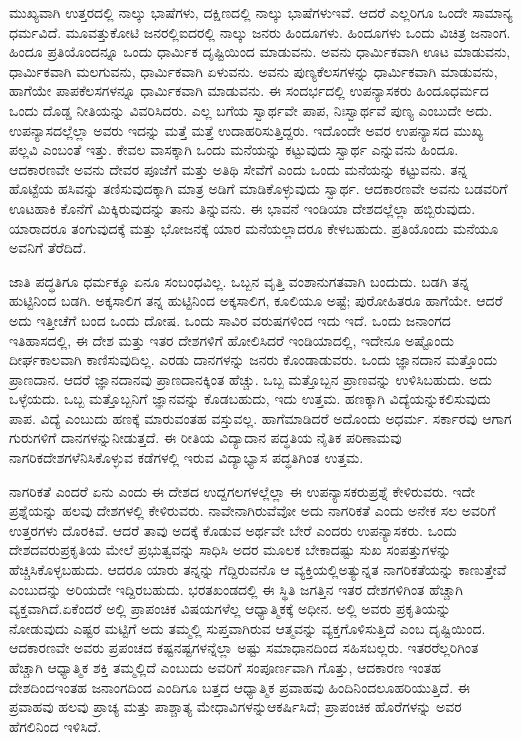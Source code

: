 ಮುಖ್ಯವಾಗಿ ಉತ್ತರದಲ್ಲಿ ನಾಲ್ಕು ಭಾಷೆಗಳು, ದಕ್ಷಿಣದಲ್ಲಿ ನಾಲ್ಕು ಭಾಷೆಗಳು\break ಇವೆ. ಆದರೆ ಎಲ್ಲರಿಗೂ ಒಂದೇ ಸಾಮಾನ್ಯ ಧರ್ಮವಿದೆ. ಮೂವತ್ತುಕೋಟಿ ಜನರಲ್ಲಿ\break ಐದರಲ್ಲಿ ನಾಲ್ಕು ಜನರು ಹಿಂದೂಗಳು. ಹಿಂದೂಗಳು ಒಂದು ವಿಚಿತ್ರ ಜನಾಂಗ. ಹಿಂದೂ ಪ್ರತಿಯೊಂದನ್ನೂ ಒಂದು ಧಾರ್ಮಿಕ ದೃಷ್ಟಿಯಿಂದ ಮಾಡುವನು. ಅವನು ಧಾರ್ಮಿಕವಾಗಿ ಊಟ ಮಾಡುವನು, ಧಾರ್ಮಿಕವಾಗಿ ಮಲಗುವನು, ಧಾರ್ಮಿಕವಾಗಿ ಏಳುವನು. ಅವನು ಪುಣ್ಯಕೆಲಸಗಳನ್ನು ಧಾರ್ಮಿಕವಾಗಿ ಮಾಡುವನು, ಹಾಗೆಯೇ ಪಾಪಕೆಲಸಗಳನ್ನೂ ಧಾರ್ಮಿಕವಾಗಿ ಮಾಡುವನು. ಈ ಸಂದರ್ಭದಲ್ಲಿ ಉಪನ್ಯಾಸಕರು ಹಿಂದೂಧರ್ಮದ ಒಂದು ದೊಡ್ಡ ನೀತಿಯನ್ನು ವಿವರಿಸಿದರು. ಎಲ್ಲ ಬಗೆಯ ಸ್ವಾರ್ಥವೇ ಪಾಪ, ನಿಃಸ್ವಾರ್ಥವೆ ಪುಣ್ಯ ಎಂಬುದೇ ಅದು. ಉಪನ್ಯಾಸದಲ್ಲೆಲ್ಲಾ ಅವರು ಇದನ್ನು ಮತ್ತೆ ಮತ್ತೆ ಉದಾಹರಿಸುತ್ತಿದ್ದರು. ಇದೊಂದೇ ಅವರ ಉಪನ್ಯಾಸದ ಮುಖ್ಯ ಪಲ್ಲವಿ ಎಂಬಂತೆ ಇತ್ತು. ಕೇವಲ ವಾಸಕ್ಕಾಗಿ ಒಂದು ಮನೆಯನ್ನು ಕಟ್ಟುವುದು ಸ್ವಾರ್ಥ ಎನ್ನುವನು ಹಿಂದೂ. ಆದಕಾರಣವೇ ಅವನು ದೇವರ ಪೂಜೆಗೆ ಮತ್ತು ಅತಿಥಿ ಸೇವೆಗೆ ಎಂದು ಒಂದು ಮನೆಯನ್ನು ಕಟ್ಟುವನು. ತನ್ನ ಹೊಟ್ಟೆಯ ಹಸಿವನ್ನು ತಣಿಸುವುದಕ್ಕಾಗಿ ಮಾತ್ರ ಅಡಿಗೆ ಮಾಡಿಕೊಳ್ಳುವುದು ಸ್ವಾರ್ಥ. ಆದಕಾರಣವೇ ಅವನು ಬಡವರಿಗೆ ಊಟಹಾಕಿ ಕೊನೆಗೆ ಮಿಕ್ಕಿರುವುದನ್ನು ತಾನು ತಿನ್ನುವನು. ಈ ಭಾವನೆ ಇಂಡಿಯಾ ದೇಶದಲ್ಲೆಲ್ಲಾ ಹಬ್ಬಿರುವುದು. ಯಾರಾದರೂ ತಂಗುವುದಕ್ಕೆ ಮತ್ತು ಭೋಜನಕ್ಕೆ ಯಾರ ಮನೆಯಲ್ಲಾದರೂ ಕೇಳಬಹುದು. ಪ್ರತಿಯೊಂದು ಮನೆಯೂ ಅವನಿಗೆ ತೆರೆದಿದೆ.

ಜಾತಿ ಪದ್ಧತಿಗೂ ಧರ್ಮಕ್ಕೂ ಏನೂ ಸಂಬಂಧವಿಲ್ಲ. ಒಬ್ಬನ ವೃತ್ತಿ ವಂಶಾನುಗತವಾಗಿ ಬಂದುದು. ಬಡಗಿ ತನ್ನ ಹುಟ್ಟಿನಿಂದ ಬಡಗಿ. ಅಕ್ಕಸಾಲಿಗ ತನ್ನ ಹುಟ್ಟಿನಿಂದ ಅಕ್ಕಸಾಲಿಗ, ಕೂಲಿಯೂ ಅಷ್ಟೆ; ಪುರೋಹಿತರೂ ಹಾಗೆಯೇ. ಆದರೆ ಅದು ಇತ್ತೀಚೆಗೆ ಬಂದ ಒಂದು ದೋಷ. ಒಂದು ಸಾವಿರ ವರುಷಗಳಿಂದ ಇದು ಇದೆ. ಒಂದು ಜನಾಂಗದ ಇತಿಹಾಸದಲ್ಲಿ, ಈ ದೇಶ ಮತ್ತು ಇತರ ದೇಶಗಳಿಗೆ ಹೋಲಿಸಿದರೆ ಇಂಡಿಯಾದಲ್ಲಿ, ಇದೇನೂ ಅಷ್ಟೊಂದು ದೀರ್ಘಕಾಲವಾಗಿ ಕಾಣಿಸುವುದಿಲ್ಲ. ಎರಡು ದಾನಗಳನ್ನು ಜನರು ಕೊಂಡಾಡುವರು. ಒಂದು ಜ್ಞಾನದಾನ ಮತ್ತೊಂದು ಪ್ರಾಣದಾನ. ಆದರೆ ಜ್ಞಾನದಾನವು ಪ್ರಾಣದಾನಕ್ಕಿಂತ ಹೆಚ್ಚು. ಒಬ್ಬ ಮತ್ತೊಬ್ಬನ ಪ್ರಾಣವನ್ನು ಉಳಿಸಿಬಹುದು. ಅದು ಒಳ್ಳೆಯದು. ಒಬ್ಬ ಮತ್ತೊಬ್ಬನಿಗೆ ಜ್ಞಾನವನ್ನು ಕೊಡಬಹುದು, ಇದು ಉತ್ತಮ. ಹಣಕ್ಕಾಗಿ ವಿದ್ಯೆಯನ್ನು\break ಕಲಿಸುವುದು ಪಾಪ. ವಿದ್ಯೆ ಎಂಬುದು ಹಣಕ್ಕೆ ಮಾರುವಂತಹ ವಸ್ತುವಲ್ಲ. ಹಾಗೆ\break ಮಾಡಿದರೆ ಅದೊಂದು ಅಧರ್ಮ. ಸರ್ಕಾರವು ಆಗಾಗ ಗುರುಗಳಿಗೆ ದಾನಗಳನ್ನು\break ನೀಡುತ್ತದೆ. ಈ ರೀತಿಯ ವಿದ್ಯಾದಾನ ಪದ್ಧತಿಯ ನೈತಿಕ ಪರಿಣಾಮವು ನಾಗರಿಕ\break ದೇಶಗಳೆನಿಸಿಕೊಳ್ಳುವ ಕಡೆಗಳಲ್ಲಿ ಇರುವ ವಿದ್ಯಾಭ್ಯಾಸ ಪದ್ಧತಿಗಿಂತ ಉತ್ತಮ.

ನಾಗರಿಕತೆ ಎಂದರೆ ಏನು ಎಂದು ಈ ದೇಶದ ಉದ್ದಗಲಗಳಲ್ಲೆಲ್ಲಾ ಈ ಉಪನ್ಯಾಸಕರು\break ಪ್ರಶ್ನೆ ಕೇಳಿರುವರು. ಇದೇ ಪ್ರಶ್ನೆಯನ್ನು ಹಲವು ದೇಶಗಳಲ್ಲಿ ಕೇಳಿರುವರು. ನಾವೇನಾಗಿರು\-ವೆವೋ ಅದು ನಾಗರಿಕತೆ ಎಂದು ಅನೇಕ ಸಲ ಅವರಿಗೆ ಉತ್ತರಗಳು ದೊರಕಿವೆ. ಆದರೆ ತಾವು ಅದಕ್ಕೆ ಕೊಡುವ ಅರ್ಥವೇ ಬೇರೆ ಎಂದರು ಉಪನ್ಯಾಸಕರು. ಒಂದು ದೇಶದವರು\break ಪ್ರಕೃತಿಯ ಮೇಲೆ ಪ್ರಭುತ್ವವನ್ನು ಸಾಧಿಸಿ ಅದರ ಮೂಲಕ ಬೇಕಾದಷ್ಟು ಸುಖ ಸಂಪತ್ತುಗಳನ್ನು ಹೆಚ್ಚಿಸಿಕೊಳ್ಳಬಹುದು. ಆದರೂ ಯಾರು ತನ್ನನ್ನು ಗೆದ್ದಿರುವನೊ ಆ ವ್ಯಕ್ತಿಯಲ್ಲಿ\break ಅತ್ಯುನ್ನತ ನಾಗರಿಕತೆಯನ್ನು ಕಾಣುತ್ತೇವೆ ಎಂಬುದನ್ನು ಅರಿಯದೇ ಇದ್ದಿರಬಹುದು. ಭರತಖಂಡದಲ್ಲಿ ಈ ಸ್ಥಿತಿ ಜಗತ್ತಿನ ಇತರ ದೇಶಗಳಿಗಿಂತ ಹೆಚ್ಚಾಗಿ ವ್ಯಕ್ತವಾಗಿದೆ.\break ಏಕೆಂದರೆ ಅಲ್ಲಿ ಪ್ರಾಪಂಚಿಕ ವಿಷಯಗಳೆಲ್ಲ ಆಧ್ಯಾತ್ಮಿಕಕ್ಕೆ ಅಧೀನ. ಅಲ್ಲಿ ಅವರು ಪ್ರಕೃತಿಯನ್ನು ನೋಡುವುದು ಎಷ್ಟರ ಮಟ್ಟಿಗೆ ಅದು ತಮ್ಮಲ್ಲಿ ಸುಪ್ತವಾಗಿರುವ ಆತ್ಮವನ್ನು ವ್ಯಕ್ತಗೊಳಿಸುತ್ತಿದೆ ಎಂಬ ದೃಷ್ಟಿಯಿಂದ. ಆದಕಾರಣವೇ ಅವರು ಪ್ರಪಂಚದ ಕಷ್ಟನಷ್ಟಗಳನ್ನೆಲ್ಲಾ ಅಷ್ಟು ಸಮಾಧಾನದಿಂದ ಸಹಿಸಬಲ್ಲರು. ಇತರರೆಲ್ಲರಿಗಿಂತ ಹೆಚ್ಚಾಗಿ ಆಧ್ಯಾತ್ಮಿಕ ಶಕ್ತಿ ತಮ್ಮಲ್ಲಿದೆ ಎಂಬುದು ಅವರಿಗೆ ಸಂಪೂರ್ಣವಾಗಿ ಗೊತ್ತು, ಆದಕಾರಣ ಇಂತಹ ದೇಶದಿಂದ\break ಇಂತಹ ಜನಾಂಗದಿಂದ ಎಂದಿಗೂ ಬತ್ತದ ಆಧ್ಯಾತ್ಮಿಕ ಪ್ರವಾಹವು ಹಿಂದಿನಿಂದಲೂ\break ಹರಿಯುತ್ತಿದೆ. ಈ ಪ್ರವಾಹವು ಹಲವು ಪ್ರಾಚ್ಯ ಮತ್ತು ಪಾಶ್ಚಾತ್ಯ ಮೇಧಾವಿಗಳನ್ನು\break ಆಕರ್ಷಿಸಿದೆ; ಪ್ರಾಪಂಚಿಕ ಹೊರೆಗಳನ್ನು ಅವರ ಹೆಗಲಿನಿಂದ ಇಳಿಸಿದೆ.

